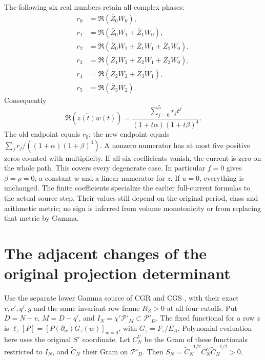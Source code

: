 \documentclass[11pt]{article}
\begin{document}
The following six real numbers retain all complex phases:
\begin{equation}\tag{ACC15}
\begin{aligned}
r_0&=\Re(\overline Z_0W_0),\\
r_1&=\Re(\overline Z_0W_1+\overline Z_1W_0),\\
r_2&=\Re(\overline Z_0W_2+\overline Z_1W_1+\overline Z_2W_0),\\
r_3&=\Re(\overline Z_1W_2+\overline Z_2W_1+\overline Z_3W_0),\\
r_4&=\Re(\overline Z_2W_2+\overline Z_3W_1),\\
r_5&=\Re(\overline Z_3W_2).
\end{aligned}
\end{equation}
Consequently
\begin{equation}\tag{ACC16}
\boxed{\Re(\overline{z(t)}w(t))
=\frac{\sum_{j=0}^5r_jt^j}{(1+t\alpha)(1+t\beta)^4}.}
\end{equation}
The old endpoint equals \(r_0\); the new endpoint equals
\(\sum_jr_j/((1+\alpha)(1+\beta)^4)\).
A nonzero numerator has at most five positive zeros counted with
multiplicity. If all six coefficients vanish, the current is zero
on the whole path. This covers every degenerate case.
In particular \(f=0\) gives \(\beta=\rho=0\), a constant \(w\) and
a linear numerator for \(z\). If \(u=0\), everything is unchanged.
The finite coefficients specialize the earlier full-current formulas
to the actual source step. Their values still depend on the original
period, class and arithmetic metric; no sign is inferred from volume
monotonicity or from replacing that metric by Gamma.

\section{The adjacent changes of the original projection determinant}
Use the separate lower Gamma source of CGR and CGS \cite{CGR,CGS},
with their exact \(v,c',q',g\) and the same invariant row frame
\(R_Z>0\) at all four cutoffs. Put
\(D=N-v\), \(M=D-q'\), and \(I_N=\chi'\mathcal P'_M\subset\mathcal P'_D\).
The fixed functional for a row \(z\) is
\(\ell_z[P]=[P(\partial_w)G_z(w)]_{w=0}\), with \(G_z=F_z/E_A\).
Polynomial evaluation here uses the original \(S'\) coordinate.
Let \(C_N^U\) be the Gram of these functionals restricted to \(I_N\),
and \(\widetilde C_N\) their Gram on \(\mathcal P'_D\).
Then \(S_N=\widetilde C_N^{-1/2}C_N^U\widetilde C_N^{-1/2}>0\).
\end{document}
